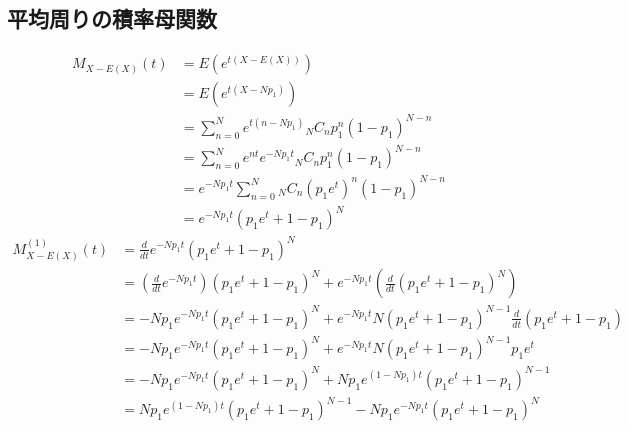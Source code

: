 \documentclass[dvipdfmx]{jsarticle}
\begin{document}
 \subsection{平均周りの積率母関数}
 \begin{align}
  M_{X-E\left(X\right)}\left(t\right)&=E\left(e^{t\left(X-E\left(X\right)\right)}\right)\nonumber\\
  &=E\left(e^{t\left(X-Np_1\right)}\right)\nonumber\\
  &=\sum_{n=0}^Ne^{t\left(n-Np_1\right)}{}_NC_np_1^n\left(1-p_1\right)^{N-n}\nonumber\\
  &=\sum_{n=0}^Ne^{nt}e^{-Np_1t}{}_NC_np_1^n\left(1-p_1\right)^{N-n}\nonumber\\
  &=e^{-Np_1t}\sum_{n=0}^N{}_NC_n\left(p_1e^t\right)^n\left(1-p_1\right)^{N-n}\nonumber\\
  &=e^{-Np_1t}\left(p_1e^t+1-p_1\right)^N
 \end{align}
 \begin{align}
  M_{X-E\left(X\right)}^{\left(1\right)}\left(t\right)&=\frac{d}{dt}e^{-Np_1t}\left(p_1e^t+1-p_1\right)^N\nonumber\\
  &=\left(\frac{d}{dt}e^{-Np_1t}\right)\left(p_1e^t+1-p_1\right)^N+e^{-Np_1t}\left(\frac{d}{dt}\left(p_1e^t+1-p_1\right)^N\right)\nonumber\\
  &=-Np_1e^{-Np_1t}\left(p_1e^t+1-p_1\right)^N+e^{-Np_1t}N\left(p_1e^t+1-p_1\right)^{N-1}\frac{d}{dt}\left(p_1e^t+1-p_1\right)\nonumber\\
  &=-Np_1e^{-Np_1t}\left(p_1e^t+1-p_1\right)^N+e^{-Np_1t}N\left(p_1e^t+1-p_1\right)^{N-1}p_1e^t\nonumber\\
  &=-Np_1e^{-Np_1t}\left(p_1e^t+1-p_1\right)^N+Np_1e^{\left(1-Np_1\right)t}\left(p_1e^t+1-p_1\right)^{N-1}\nonumber\\
  &=Np_1e^{\left(1-Np_1\right)t}\left(p_1e^t+1-p_1\right)^{N-1}-Np_1e^{-Np_1t}\left(p_1e^t+1-p_1\right)^N
 \end{align}
\end{document}
